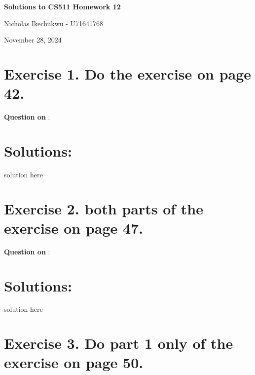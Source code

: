 \documentclass{article}
\begin{document}
\begin{center}
    \Large\textbf{Solutions to CS511 Homework 12}
    
    \vspace{0.5cm}
    
    \large Nicholas Ikechukwu - U71641768
    
    \vspace{0.3cm}
    
    \large November 28, 2024
\end{center}



\section*{Exercise 1. Do the exercise on page 42.}

\begin{mdframed}
    \vspace{1em}
        \textbf{Question on }: 
    \vspace{1em}
\end{mdframed}

\section*{Solutions: }
solution here


\newpage


\section*{Exercise 2. both parts of the exercise on page 47.}

\begin{mdframed}
    \vspace{1em}
        \textbf{Question on }: 
    \vspace{1em}
\end{mdframed}
    
\section*{Solutions: }

\vspace{1em}
solution here


\newpage


\section*{Exercise 3. Do part 1 only of the exercise on page 50.}
\end{document}

